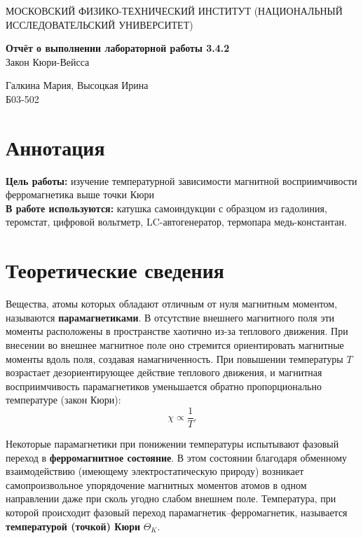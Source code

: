 \documentclass[a4paper,10pt]{article}
\begin{document}
	
    
	\begin{center}
		{\large МОСКОВСКИЙ ФИЗИКО-ТЕХНИЧЕСКИЙ ИНСТИТУТ (НАЦИОНАЛЬНЫЙ ИССЛЕДОВАТЕЛЬСКИЙ УНИВЕРСИТЕТ)}
		\end{center}
		
		
		
	\vspace{4.5cm}
		{\Large
	\begin{center}
	\end{center}
				{\bf Отчёт о выполнении лабораторной работы 3.4.2}\\
				Закон Кюри-Вейсса
		}
	\vspace{2cm}
		\begin{flushright}
			{\normalsize Галкина Мария, Высоцкая Ирина \\
				\vspace{0.2cm}
				Б03-502}
		\end{flushright}
		\vspace{8cm}
		

\section{Аннотация}
\noindent \textbf{Цель работы:} изучение температурной зависимости магнитной восприимчивости ферромагнетика выше точки Кюри\\
\textbf{В работе используются:} катушка самоиндукции с образцом из гадолиния, теромстат, цифровой вольтметр, LC-автогенератор, термопара медь-константан.

\section{Теоретические сведения}


Вещества, атомы которых обладают отличным от нуля магнитным моментом, называются \textbf{парамагнетиками}. В отсутствие внешнего магнитного поля эти моменты расположены в пространстве хаотично из-за теплового движения. При внесении во внешнее магнитное поле оно стремится ориентировать магнитные моменты вдоль поля, создавая намагниченность. При повышении температуры \(T\) возрастает дезориентирующее действие теплового движения, и магнитная восприимчивость парамагнетиков уменьшается обратно пропорционально температуре (закон Кюри):
\begin{equation}
    \chi \propto \frac{1}{T}.
\end{equation}

Некоторые парамагнетики при понижении температуры испытывают фазовый переход в \textbf{ферромагнитное состояние}. В этом состоянии благодаря обменному взаимодействию (имеющему электростатическую природу) возникает самопроизвольное упорядочение магнитных моментов атомов в одном направлении даже при сколь угодно слабом внешнем поле. Температура, при которой происходит фазовый переход парамагнетик--ферромагнетик, называется \textbf{температурой (точкой) Кюри} \(\Theta_K\).
\end{document}
